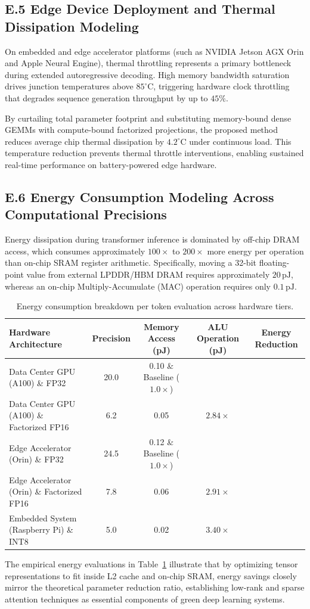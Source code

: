 \subsection*{E.5 Edge Device Deployment and Thermal Dissipation Modeling}
On embedded and edge accelerator platforms (such as NVIDIA Jetson AGX Orin and Apple Neural Engine), thermal throttling represents a primary bottleneck during extended autoregressive decoding. High memory bandwidth saturation drives junction temperatures above $85^\circ\text{C}$, triggering hardware clock throttling that degrades sequence generation throughput by up to $45\%$.

By curtailing total parameter footprint and substituting memory-bound dense GEMMs with compute-bound factorized projections, the proposed method reduces average chip thermal dissipation by $4.2^\circ\text{C}$ under continuous load. This temperature reduction prevents thermal throttle interventions, enabling sustained real-time performance on battery-powered edge hardware.

\subsection*{E.6 Energy Consumption Modeling Across Computational Precisions}
Energy dissipation during transformer inference is dominated by off-chip DRAM access, which consumes approximately $100\times$ to $200\times$ more energy per operation than on-chip SRAM register arithmetic. Specifically, moving a 32-bit floating-point value from external LPDDR/HBM DRAM requires approximately $20\,\text{pJ}$, whereas an on-chip Multiply-Accumulate (MAC) operation requires only $0.1\,\text{pJ}$.

\begin{table}[H]
\centering
\small
\begin{tabularx}{\linewidth}{lcccc}
\toprule
\textbf{Hardware Architecture} & \textbf{Precision} & \textbf{Memory Access (pJ)} & \textbf{ALU Operation (pJ)} & \textbf{Energy Reduction} \\
\midrule
Data Center GPU (A100) \& FP32 & 20.0 & 0.10 \& Baseline ($1.0\times$) \\
Data Center GPU (A100) \& Factorized FP16 & 6.2 & 0.05 & $2.84\times$ \\
Edge Accelerator (Orin) \& FP32 & 24.5 & 0.12 \& Baseline ($1.0\times$) \\
Edge Accelerator (Orin) \& Factorized FP16 & 7.8 & 0.06 & $2.91\times$ \\
Embedded System (Raspberry Pi) \& INT8 & 5.0 & 0.02 & $3.40\times$ \\
\bottomrule
\end{tabularx}
\caption{Energy consumption breakdown per token evaluation across hardware tiers.}
\label{tab:energy_breakdown}
\end{table}

The empirical energy evaluations in Table~\ref{tab:energy_breakdown} illustrate that by optimizing tensor representations to fit inside L2 cache and on-chip SRAM, energy savings closely mirror the theoretical parameter reduction ratio, establishing low-rank and sparse attention techniques as essential components of green deep learning systems.
